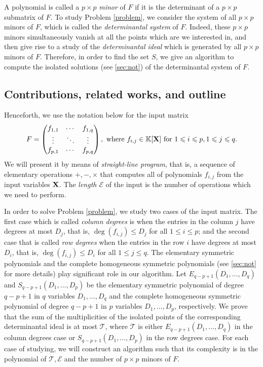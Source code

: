 \documentclass[11pt]{article}
\numberwithin{Property}{section}
\numberwithin{Theorem}{section}
\numberwithin{Proposition}{section}
\numberwithin{Lemma}{section}
\numberwithin{Corollary}{section}
\numberwithin{Definition}{section}
\numberwithin{Remark}{section}
\numberwithin{Conjecture}{section}
\numberwithin{Problem}{section}
\numberwithin{Claim}{section}
\theoremstyle{definition}
\numberwithin{Example}{section}
\renewcommand{\leq}{\leqslant}
\newcommand{\field}{\mathbb{K}} %
\newcommand{\mat}[1]{\mathbf{\MakeUppercase{#1}}} %
\newcommand{\improve}[1]{\textcolor{blue}{#1}} %
\begin{document}
A polynomial is called a $p \times p$ \emph{minor} of $F$ if it is the determinant of a $p \times p$ submatrix of $F$. To study Problem \ref{problem}, we consider the system of all $p \times p$ minors of $F$, which is called  the \emph{determinantal system} of $F$. Indeed, these $p \times p$ minors simultaneously vanish at all the points which are we interested in, and then give rise to a study of the \emph{determinantal ideal} which is generated by all $p \times p$ minors of $F$. Therefore, in order to find the set $S$, we give an algorithm to compute the isolated solutions (see \improve{\cref{sec:not}}) of the determinantal system of $F$. 
\subsection{Contributions, related works, and outline}
Henceforth, we use the notation below for the input matrix
\[ F = 
\left( \begin{matrix}
f_{1,1} & \cdots & f_{1,q}\\
\vdots & \ddots & \vdots \\
f_{p,1} & \cdots & f_{p,q}
\end{matrix} \right), \ \mathrm{where} \ f_{i,j} \in \field[\mat{X}] \ \mathrm{for} \ 1 \leq i \leq p, 1 \leq j \leq q.
\]
 We will present it by means of \emph{straight-line program}, that is, a sequence of elementary operations $+, -, \times$ that computes all of polynomials $f_{i,j}$ from the input variables $\mat{X}$. The \emph{length $\mathcal{E}$} of the input is the number of operations which we need to perform.

In order to solve Problem \ref{problem}, we study two cases of the input matrix. The first case which is called \emph{column degrees} is when the entries in the column $j$ have degrees at most $D_j$, that is, $\deg(f_{i,j}) \leq D_j$ for all $1 \leq i \leq p$; and the second case that is called \emph{row degrees} when the entries in the row $i$ have degrees at most $D_i$,  that is, $\deg(f_{i,j}) \leq D_i$ for all $1 \leq j \leq q$. The elementary symmetric polynomials and the complete homogeneous symmetric polynomials (see \improve{\cref{sec:not}} for more details) play significant role in our algorithm. Let $E_{q-p+1}(D_1, \ldots, D_q)$ and $S_{q-p+1}(D_1, \ldots, D_p)$ be the elementary symmetric polynomial of degree $q-p+1$ in $q$ variables $D_1, \ldots, D_q$ and the complete homogeneous symmetric polynomial of degree $q-p+1$ in $p$ variables $D_1, \ldots, D_p$, respectively. 
We prove that the sum of the multiplicities of the isolated points of the corresponding determinantal ideal is at most $\mathcal{T}$, where $\mathcal{T}$ is either $E_{q-p+1}(D_1, \ldots, D_q)$ in the column degrees case or $S_{q-p+1}(D_1, \ldots, D_p)$ in the row degrees case. For each case of studying, we will construct an algorithm such that its complexity is in the polynomial of $\mathcal{T}, \mathcal{E}$ and the number of $p \times p$ minors of $F$. 
\end{document}
